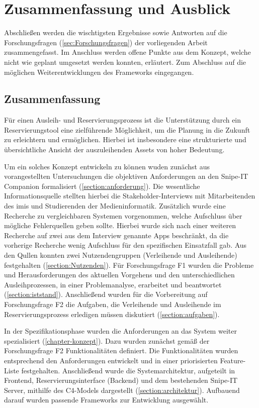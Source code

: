 
\chapter{Zusammenfassung und Ausblick}
\label{chapter-fazit}

Abschließen werden die wischtigsten Ergebnisse sowie Antworten auf die Forschungsfragen
(\ref{sec:Forschungsfragen}) der vorliegenden Arbeit zusammengefasst. Im Anschluss werden offene
Punkte aus dem Konzept, welche nicht wie geplant umgesetzt werden konnten, erläutert. Zum Abschluss
auf die möglichen Weiterentwicklungen des Frameworks eingegangen.


\section{Zusammenfassung}
Für einen Ausleih- und Reservierungsprozess ist die Unterstützung durch ein Reservierungstool eine
zielführende Möglichkeit, um die Planung in die Zukunft zu erleichtern und ermöglichen. Hierbei ist
insbesondere eine strukturierte und übersichtliche Ansicht der auszuleihenden Assets von hoher
Bedeutung.

Um ein solches Konzept entwickeln zu können wuden zunächst aus vorangestellten Untersuchungen die
objektiven Anforderungen an den Snipe-IT Companion formalisiert (\ref{section:anforderung}). Die
wesentliche Informationsquelle stellten hierbei die Stakeholder-Interviews mit Mitarbeitenden des
\ac{imis} und Studierenden der Medieninformatik. Zusätzlich wurde eine Recherche zu vergleichbaren
Systemen vorgenommen, welche Aufschluss über mögliche Fehlerquellen geben sollte. Hierbei wurde sich
nach einer weiteren Recherche auf zwei aus dem Interview genannte Apps beschränkt, da die vorherige
Recherche wenig Aufschluss für den spezifischen Einsatzfall gab. Aus den Qullen konnten zwei
Nutzendengruppen (Verleihende und Ausleihende) festgehalten (\ref{section:Nutzenden}). Für
Forschungsfrage F1 wurden die Probleme und Herausforderungen des aktuellen Vorgehens und den
unterschiedlichen Ausleihprozessen, in einer Problemanalyse, erarbeitet und beantwortet
(\ref{section:iststand}). Anschließend wurden für die Vorbereitung auf Forschungsfrage F2 die
Aufgaben, die Verleihende und Ausleihende im Reservierungsprozess erledigen müssen diskutiert
(\ref{section:aufgaben}). 

In der Spezifikationsphase wurden die Anforderungen an das System weiter spezialisiert
(\ref{chapter-konzept}). Dazu wurden zunächst gemäß der Forschungsfrage F2 Funktionalitäten
definiert. Die Funktionalitäten wurden entsprechend den Anforderungen entwickelt und in einer
priorisierten Feature-Liste festgehalten. Anschließend wurde die Systemarchitektur, aufgeteilt in
Frontend, Reservierungsinterface (Backend) und dem bestehenden Snipe-IT Server, mithilfe des
C4-Models dargestellt (\ref{section:architektur}). Aufbauend darauf wurden passende Frameworks zur
Entwicklung ausgewählt. 

